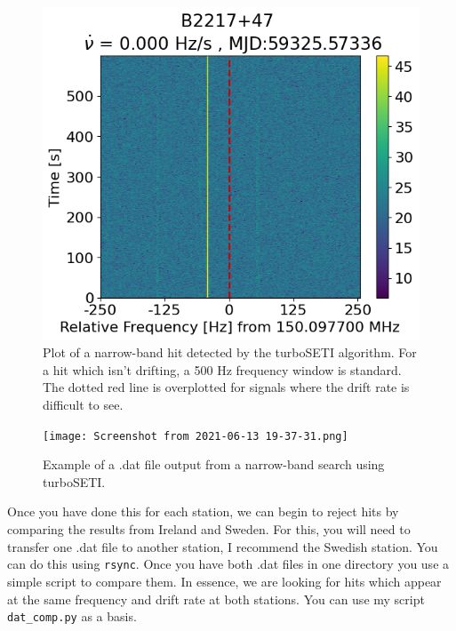 \documentclass[12pt, onepage]{article}
\numberwithin{equation}{section} %
\begin{document}
\begin{figure}
    \centering
    \includegraphics[width =0.6\linewidth]{94.png}
    \caption{Plot of a narrow-band hit detected by the turboSETI algorithm. For a hit which isn't drifting, a 500 Hz frequency window is standard. The dotted red line is overplotted for signals where the drift rate is difficult to see. }
    \label{fig:hit}
\end{figure}

\begin{figure}
    \centering
    \texttt{[image: Screenshot from 2021-06-13 19-37-31.png]}
    \caption{Example of a .dat file output from a narrow-band search using turboSETI.}
    \label{fig:dat}
\end{figure}

Once you have done this for each station, we can begin to reject hits by comparing the results from Ireland and Sweden. For this, you will need to transfer one .dat file to another station, I recommend the Swedish station. You can do this using \texttt{rsync}. Once you have both .dat files in one directory you use a simple script to compare them. In essence, we are looking for hits which appear at the same frequency and drift rate at both stations. You can use my script \texttt{dat\_comp.py} as a basis. 
\end{document}
